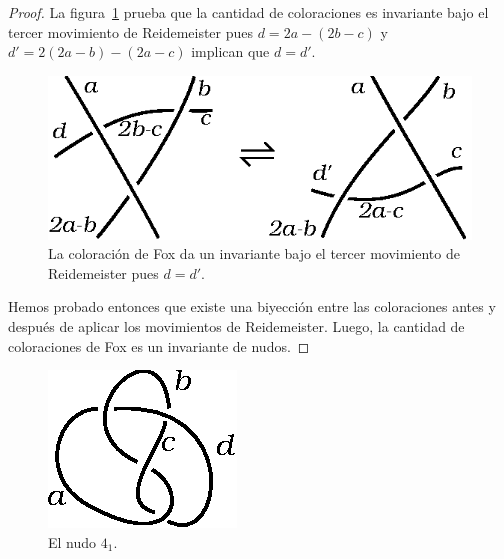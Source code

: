 \documentclass[graybox]{svmult}
\begin{document}
\begin{theorem}
\begin{proof}
		La figura~\ref{fig:coloringR3} prueba que la cantidad de
		coloraciones es invariante bajo el tercer movimiento de Reidemeister
		pues $d=2a-(2b-c)$ y $d'=2(2a-b)-(2a-c)$ implican que $d=d'$.
		\begin{figure}[ht]
			\centering
				\includegraphics[scale=0.6]{images/coloringR3}
				\caption{La coloración de Fox da un invariante bajo el tercer movimiento
				de Reidemeister pues $d=d'$.}
				\label{fig:coloringR3}
		\end{figure}
		
        Hemos probado entonces que existe una biyección entre las coloraciones
        antes y después de aplicar los movimientos de Reidemeister. Luego, la
        cantidad de coloraciones de Fox es un invariante de nudos.
    \end{proof}
\end{theorem}

\begin{figure}[ht]
	\centering
	\includegraphics[scale=0.7]{images/labels4_1}
	\caption{El nudo $4_1$.}
	\label{fig:labels4_1}
\end{figure}
\end{document}

